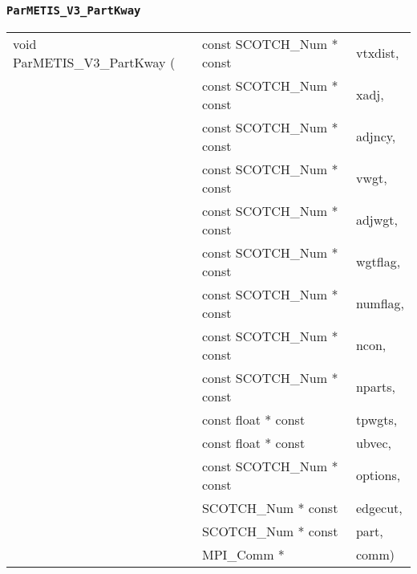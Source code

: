 \subsubsection{{\tt ParMETIS\_V3\_PartKway}}

\begin{itemize}
\progsyn

{\tt\begin{tabular}{l@{}ll}
void ParMETIS\_V3\_PartKway ( & const SCOTCH\_Num * const & vtxdist, \\
                              & const SCOTCH\_Num * const & xadj, \\
                              & const SCOTCH\_Num * const & adjncy, \\
                              & const SCOTCH\_Num * const & vwgt, \\
                              & const SCOTCH\_Num * const & adjwgt, \\
                              & const SCOTCH\_Num * const & wgtflag, \\
                              & const SCOTCH\_Num * const & numflag, \\
                              & const SCOTCH\_Num * const & ncon, \\
                              & const SCOTCH\_Num * const & nparts, \\
                              & const float * const       & tpwgts, \\
                              & const float * const       & ubvec, \\
                              & const SCOTCH\_Num * const & options, \\
                              & SCOTCH\_Num * const       & edgecut, \\
                              & SCOTCH\_Num * const       & part, \\
                              & MPI\_Comm *               & comm)
\end{tabular}}


\end{itemize}
